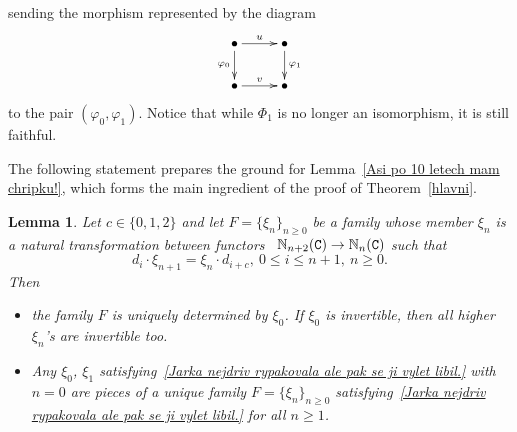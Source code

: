 \documentclass[12pt,leqno]{amsart}
\newtheorem{lemma}[theorem]{Lemma}
\theoremstyle{definition}
\newcommand{\C}{{\tt C}}
\newcommand{\NN}{\mathbb{N}}
\newcommand{\4}{\texttt{4}}
\renewcommand{\phi}{\varphi}
\begin{document}
sending the morphism represented by the diagram
\[
\xymatrix@R=2em@C=2.5em{\bullet \ar[d]_(.5){\varphi_0} \ar[r]^{u} 
& \bullet  \ar[d]^(.5){\varphi_1} 
\\
\bullet \ar[r]^{v} & \bullet 
}
\]
to the pair $(\phi_0,\phi_1)$. Notice that while $\Phi_1$ is no longer an
isomorphism, it is still faithful.

The following statement prepares the ground for Lemma~\ref{Asi po 10
  letech mam chripku!}, which forms the main ingredient of the proof of
Theorem~\ref{hlavni}.  

\begin{lemma}
\label{hovadsti cinsti komunisti}
Let $c \in \{0,1,2\}$ and let $F = \{\xi_n\}_{n \geq 0}$ be a family
whose 
member $\xi_n$
is a natural transformation between 
functors \ $\NN_{n+2}(\C) \to  \NN_{n}(\C)$ such
that 
\begin{equation}
\label{Jarka nejdriv rypakovala ale pak se ji vylet libil.}
d_{i} \cdot \xi_{n+1} = \xi_{n} \cdot d_{i+c}, \ 0 \leq i \leq n+1,\
n \geq 0.
\end{equation}
Then 
\begin{itemize}
\item [(i)]
the family $F$ is uniquely determined by $\xi_0$. If $\xi_0$ is
invertible, then all higher $\xi_n$'s are invertible too.
\item [(ii)]
Any $\xi_0$, $\xi_1$ satisfying~\eqref{Jarka nejdriv
  rypakovala ale pak se ji vylet libil.} with $n =0$ are pieces of  a
unique family $F = \{\xi_n\}_{n \geq 0}$ satisfying~\eqref{Jarka nejdriv
  rypakovala ale pak se ji vylet libil.} for all $n \geq 1$. 
\end{itemize}
\end{lemma}
\end{document}
